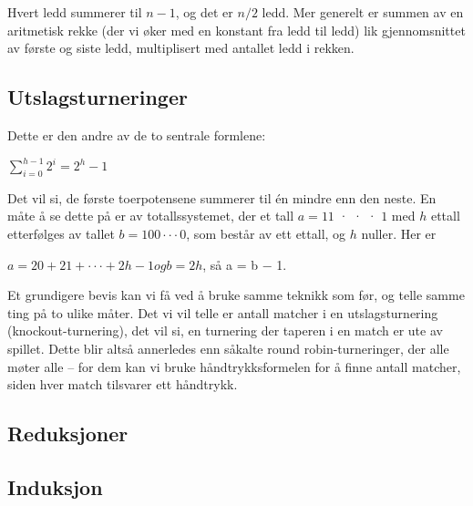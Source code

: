 \noindent Hvert ledd summerer til $n−1$, og det er $n/2$ ledd. Mer generelt er summen av en
aritmetisk rekke (der vi øker med en konstant fra ledd til ledd) lik gjennomsnittet
av første og siste ledd, multiplisert med antallet ledd i rekken.

\subsection{Utslagsturneringer}
Dette er den andre av de to sentrale formlene:
\begin{center}
$\sum\limits_{i=0}^{h-1} 2^i = 2^h - 1$
\end{center}
Det vil si, de første toerpotensene summerer til én mindre enn den neste. En
måte å se dette på er av totallssystemet, der et tall $a = 11$ · · · $1$ med $h$ ettall
etterfølges av tallet $b = 100 · · · 0$, som består av ett ettall, og $h$ nuller. Her er
\begin{center}
$a = 20 + 21 + · · · + 2h−1 og b = 2h$, så a = b − 1.
\end{center}

\noindent Et grundigere bevis kan vi få ved å bruke samme teknikk som før, og telle
samme ting på to ulike måter. Det vi vil telle er antall matcher i en utslagsturnering
(knockout-turnering), det vil si, en turnering der taperen i en match er
ute av spillet. Dette blir altså annerledes enn såkalte round robin-turneringer,
der alle møter alle – for dem kan vi bruke håndtrykksformelen for å finne antall
matcher, siden hver match tilsvarer ett håndtrykk.


\subsection{Reduksjoner}

\subsection{Induksjon}
